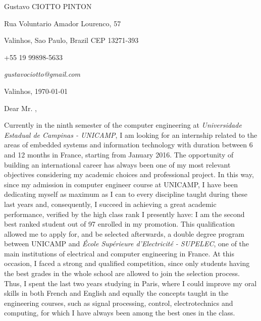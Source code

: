 \documentclass[12pt, a4paper]{article}
\begin{document}
\pagestyle{empty} 

Gustavo CIOTTO PINTON

Rua Voluntario Amador Lourenco, 57

Valinhos, Sao Paulo, Brazil CEP 13271-393

+55 19 99898-5633	

\textit{gustavociotto@gmail.com}
\begin{flushright}
Valinhos,  \today





\end{flushright}

Dear Mr. , 

\vspace{12pt}
Currently in the ninth semester of the computer engineering at
\textit{Universidade Estadual de Campinas - UNICAMP}, I am looking for an
internship related to the areas of embedded systems and information technology
with duration between 6 and 12 months in France, starting from January 2016. The opportunity of
building an international career has always been one of my most relevant
objectives considering my academic choices and professional project. In this
way, since my admission in computer engineer course at UNICAMP, I have been
dedicating myself as maximum as I can to every discipline taught during these
last years and, consequently, I succeed in achieving a great academic
performance, verified by the high class rank I presently have: I am the second
best ranked student out of 97 enrolled in my promotion. This qualification
allowed me to apply for, and be selected afterwards, a double degree program
between UNICAMP and \textit{École Supérieure d'Electricité - SUPELEC}, one of
the main institutions of electrical and computer engineering in France. At this
occasion, I faced a strong and qualified competition, since only students
having the best grades in the whole school are allowed to join the selection
process. Thus, I spent the last two years studying in Paris, where I could
improve my oral skills in both French and English and equally the concepts
taught in the engineering courses, such as signal processing, control,
electrotechnics and computing, for which I have always been among the best ones
in the class.
\end{document}
